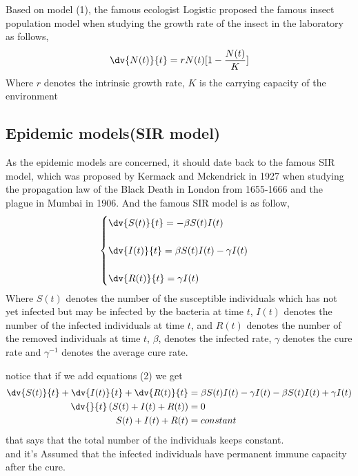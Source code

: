 Based on model (1), the famous ecologist Logistic proposed the famous insect population model when studying the growth rate of the insect in the laboratory as follows,
\[
        \dv{N(t)}{t} =rN(t)[1-\frac{N(t)}{K}]
\]
Where $r$ denotes the intrinsic growth rate, $K$ is the carrying capacity of the environment


\subsection{Epidemic models(SIR model)}
As the epidemic models are concerned, it should date back to the famous SIR model, 
which was proposed by Kermack and Mckendrick in 1927 when studying the propagation 
law of the Black Death in London from 1655-1666 and the plague in Mumbai in 1906. 
And the famous SIR model is as follow,
\begin{equation}
        \begin{cases}
                \displaystyle \dv{S(t)}{t} = -\beta S(t)I(t)
                \\\\
                \displaystyle \dv{I(t)}{t} = \beta S(t)I(t)-\gamma I(t)
                \\\\
                \displaystyle \dv{R(t)}{t} = \gamma I(t)
        \end{cases}               
\end{equation}
Where $S(t)$ denotes the number of the susceptible individuals which has not yet infected 
but may be infected by the bacteria at time $t$, $I(t)$ denotes the number of the infected 
individuals at time $t$, and $R(t)$ denotes the number of the removed individuals at time $t$, $\beta$, 
denotes the infected rate, $\gamma$ denotes the cure rate and $\gamma^{-1}$ denotes the average cure rate.

notice that if we add equations (2) we get 
\begin{align*}
        \dv{S(t)}{t} + \dv{I(t)}{t} + \dv{R(t)}{t} &= \beta S(t)I(t)-\gamma I(t) -\beta S(t)I(t) + \gamma I(t) 
        \\
        \dv{}{t} \left(S(t) + I(t) + R(t)\right) &= 0
        \\
        S(t) + I(t) + R(t) &= constant
\end{align*}
that says that the total number of the individuals keeps constant. 
\\
and it's Assumed that the infected individuals have permanent immune capacity after the cure.